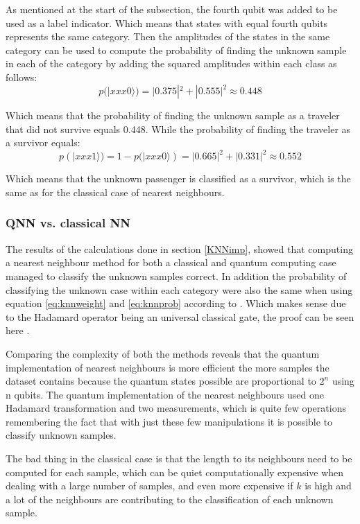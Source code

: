 \documentclass[../main.tex]{subfiles}
\begin{document}
As mentioned at the start of the subsection, the fourth qubit was added to be used as a label indicator. Which means that states with equal fourth qubits represents the same category. Then the amplitudes of the states in the same category can be used to compute the probability of finding the unknown sample in each of the category by adding the squared amplitudes within each class as follows:
\begin{equation}
p(|xxx0\rangle)=|0.375|^2+|0.555|^2\approx0.448
\end{equation}

Which means that the probability of finding the unknown sample as a traveler that did not survive equals 0.448. While the probability of finding the traveler as a survivor equals:
\begin{equation}
p(|xxx1\rangle)=1-p(|xxx0\rangle)=|0.665|^2+|0.331|^2\approx0.552
\end{equation}

Which means that the unknown passenger is classified as a survivor, which is the same as for the classical case of nearest neighbours.

\subsubsection{QNN vs. classical NN}
The results of the calculations done in section \ref{KNNimp}, showed that computing a nearest neighbour method for both a classical and quantum computing case managed to classify the unknown samples correct. In addition the probability of classifying the unknown case within each category were also the same when using equation \eqref{eq:knnweight} and \eqref{eq:knnprob} according to \cite[ch.~1]{10.5555/3309066}. Which makes sense due to the Hadamard operator being an universal classical gate, the proof can be seen here \cite{cite:hadamardproof}.

Comparing the complexity of both the methods reveals that the quantum implementation of nearest neighbours is more efficient the more samples the dataset contains because the quantum states possible are proportional to \ensuremath{2^n} using n qubits. The quantum implementation of the nearest neighbours used one Hadamard transformation and two measurements, which is quite few operations remembering the fact that with just these few manipulations it is possible to classify unknown samples. 

The bad thing in the classical case is that the length to its neighbours need to be computed for each sample, which can be quiet computationally expensive when dealing with a large number of samples, and even more expensive if \ensuremath{k} is high and a lot of the neighbours are contributing to the classification of each unknown sample.
\end{document}
